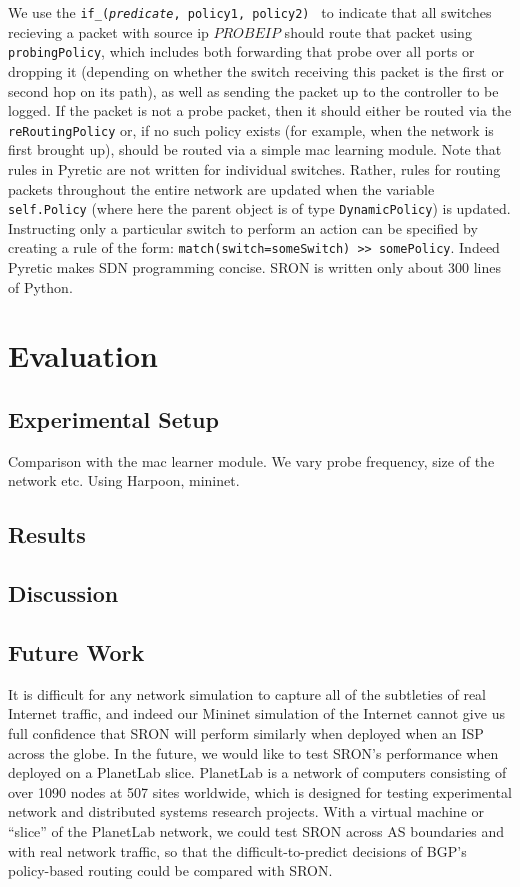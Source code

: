 \documentclass[pageno]{jpaper}
\begin{document}
We use the {\tt if\_({\it predicate}, policy1, policy2) } to indicate that all switches recieving a packet with source ip $PROBEIP$ should route that packet using {\tt probingPolicy}, which includes both forwarding that probe over all ports or dropping it (depending on whether the switch receiving this packet is the first or second hop on its path), as well as sending the packet up to the controller to be logged.  If the packet is not a probe packet, then it should either be routed via the {\tt reRoutingPolicy} or, if no such policy exists (for example, when the network is first brought up), should be routed via a simple mac learning module.  Note that rules in Pyretic are not written for individual switches.  Rather, rules for routing packets throughout the entire network are updated when the variable {\tt self.Policy} (where here the parent object is of type {\tt DynamicPolicy}) is updated.  Instructing only a particular switch to perform an action can be specified by creating a rule of the form: {\tt match(switch=someSwitch) >> somePolicy}.  Indeed Pyretic makes SDN programming concise. SRON is written only about 300 lines of Python.

\section{Evaluation}
\subsection{Experimental Setup}
Comparison with the mac learner module. We vary probe frequency, size of the network etc.
Using Harpoon, mininet.

\subsection{Results}
\subsection{Discussion}

\subsection{Future Work}

	It is difficult for any network simulation to capture all of the subtleties of real 
Internet traffic, and indeed our Mininet simulation of the Internet cannot give us 
full confidence that SRON will perform similarly when deployed when an ISP across the globe.
In the future, we would like to test SRON's performance when deployed on a PlanetLab\cite{planetlab} 
slice.  PlanetLab is a network of computers consisting of over 1090 nodes at 507 sites worldwide, 
which is designed for testing experimental network and distributed systems research projects.  With a 
virtual machine or ``slice'' of the PlanetLab network, we could test SRON across AS boundaries and with 
real network traffic, so that 
the difficult-to-predict decisions of BGP's policy-based routing could be compared with SRON.
\end{document}
